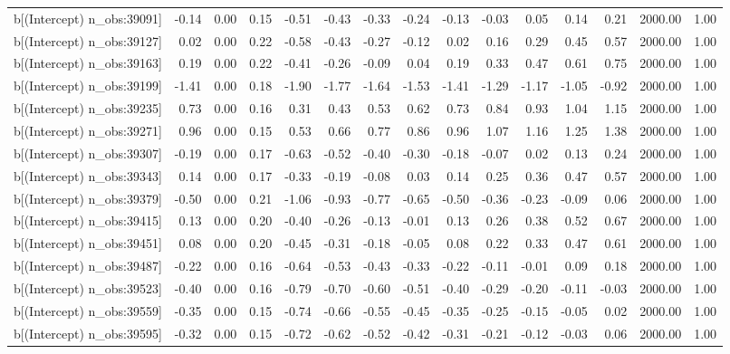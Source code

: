 \begin{table}[ht]
\begin{tabular}{rrrrrrrrrrrrrrr}
  b[(Intercept) n\_obs:39091] & -0.14 & 0.00 & 0.15 & -0.51 & -0.43 & -0.33 & -0.24 & -0.13 & -0.03 & 0.05 & 0.14 & 0.21 & 2000.00 & 1.00 \\ 
  b[(Intercept) n\_obs:39127] & 0.02 & 0.00 & 0.22 & -0.58 & -0.43 & -0.27 & -0.12 & 0.02 & 0.16 & 0.29 & 0.45 & 0.57 & 2000.00 & 1.00 \\ 
  b[(Intercept) n\_obs:39163] & 0.19 & 0.00 & 0.22 & -0.41 & -0.26 & -0.09 & 0.04 & 0.19 & 0.33 & 0.47 & 0.61 & 0.75 & 2000.00 & 1.00 \\ 
  b[(Intercept) n\_obs:39199] & -1.41 & 0.00 & 0.18 & -1.90 & -1.77 & -1.64 & -1.53 & -1.41 & -1.29 & -1.17 & -1.05 & -0.92 & 2000.00 & 1.00 \\ 
  b[(Intercept) n\_obs:39235] & 0.73 & 0.00 & 0.16 & 0.31 & 0.43 & 0.53 & 0.62 & 0.73 & 0.84 & 0.93 & 1.04 & 1.15 & 2000.00 & 1.00 \\ 
  b[(Intercept) n\_obs:39271] & 0.96 & 0.00 & 0.15 & 0.53 & 0.66 & 0.77 & 0.86 & 0.96 & 1.07 & 1.16 & 1.25 & 1.38 & 2000.00 & 1.00 \\ 
  b[(Intercept) n\_obs:39307] & -0.19 & 0.00 & 0.17 & -0.63 & -0.52 & -0.40 & -0.30 & -0.18 & -0.07 & 0.02 & 0.13 & 0.24 & 2000.00 & 1.00 \\ 
  b[(Intercept) n\_obs:39343] & 0.14 & 0.00 & 0.17 & -0.33 & -0.19 & -0.08 & 0.03 & 0.14 & 0.25 & 0.36 & 0.47 & 0.57 & 2000.00 & 1.00 \\ 
  b[(Intercept) n\_obs:39379] & -0.50 & 0.00 & 0.21 & -1.06 & -0.93 & -0.77 & -0.65 & -0.50 & -0.36 & -0.23 & -0.09 & 0.06 & 2000.00 & 1.00 \\ 
  b[(Intercept) n\_obs:39415] & 0.13 & 0.00 & 0.20 & -0.40 & -0.26 & -0.13 & -0.01 & 0.13 & 0.26 & 0.38 & 0.52 & 0.67 & 2000.00 & 1.00 \\ 
  b[(Intercept) n\_obs:39451] & 0.08 & 0.00 & 0.20 & -0.45 & -0.31 & -0.18 & -0.05 & 0.08 & 0.22 & 0.33 & 0.47 & 0.61 & 2000.00 & 1.00 \\ 
  b[(Intercept) n\_obs:39487] & -0.22 & 0.00 & 0.16 & -0.64 & -0.53 & -0.43 & -0.33 & -0.22 & -0.11 & -0.01 & 0.09 & 0.18 & 2000.00 & 1.00 \\ 
  b[(Intercept) n\_obs:39523] & -0.40 & 0.00 & 0.16 & -0.79 & -0.70 & -0.60 & -0.51 & -0.40 & -0.29 & -0.20 & -0.11 & -0.03 & 2000.00 & 1.00 \\ 
  b[(Intercept) n\_obs:39559] & -0.35 & 0.00 & 0.15 & -0.74 & -0.66 & -0.55 & -0.45 & -0.35 & -0.25 & -0.15 & -0.05 & 0.02 & 2000.00 & 1.00 \\ 
  b[(Intercept) n\_obs:39595] & -0.32 & 0.00 & 0.15 & -0.72 & -0.62 & -0.52 & -0.42 & -0.31 & -0.21 & -0.12 & -0.03 & 0.06 & 2000.00 & 1.00 \\ 

\end{tabular}
\end{table}
